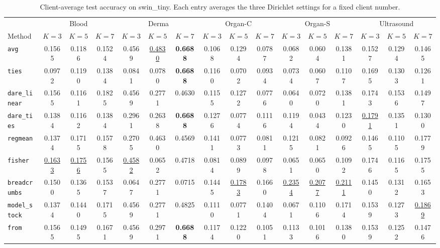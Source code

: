 \begin{table}[t]
\centering
\scriptsize
\setlength{\tabcolsep}{2.6pt}
\caption{Client-average test accuracy on swin\_tiny. Each entry averages the three Dirichlet settings for a fixed client number.}
\label{tab:client-avg-swin-tiny}
\begin{tabular}{lccccccccccccccc}
\toprule
& \multicolumn{3}{c}{Blood} & \multicolumn{3}{c}{Derma} & \multicolumn{3}{c}{Organ-C} & \multicolumn{3}{c}{Organ-S} & \multicolumn{3}{c}{Ultrasound} \\
\cmidrule(lr){2-4}\cmidrule(lr){5-7}\cmidrule(lr){8-10}\cmidrule(lr){11-13}\cmidrule(lr){14-16}
Method & $K=3$ & $K=5$ & $K=7$ & $K=3$ & $K=5$ & $K=7$ & $K=3$ & $K=5$ & $K=7$ & $K=3$ & $K=5$ & $K=7$ & $K=3$ & $K=5$ & $K=7$ \\
\midrule
\texttt{avg} & 0.1565 & 0.1186 & 0.1524 & 0.4569 & \underline{0.4830} & \textbf{0.6688} & 0.1068 & 0.1294 & 0.0787 & 0.0682 & 0.0604 & 0.1381 & 0.1527 & 0.1294 & 0.1465 \\
\texttt{ties} & 0.0972 & 0.1190 & 0.1384 & 0.0841 & 0.0780 & \textbf{0.6688} & 0.1160 & 0.0702 & 0.0934 & 0.0734 & 0.0607 & 0.1107 & 0.1695 & 0.1303 & 0.1261 \\
\texttt{dare\_linear} & 0.1565 & 0.1161 & 0.1825 & 0.4569 & 0.2771 & 0.4630 & 0.1155 & 0.1272 & 0.0776 & 0.0640 & 0.0720 & 0.1381 & 0.1743 & 0.1536 & 0.1497 \\
\texttt{dare\_ties} & 0.1384 & 0.1162 & 0.1384 & 0.2961 & 0.2638 & \textbf{0.6688} & 0.1276 & 0.0774 & 0.1116 & 0.1194 & 0.0434 & 0.1230 & \underline{0.1791} & 0.1351 & 0.1300 \\
\texttt{regmean} & 0.1374 & 0.1715 & 0.1578 & 0.2705 & 0.4630 & 0.4569 & 0.1411 & 0.0773 & 0.0811 & 0.1215 & 0.0821 & 0.0926 & 0.1465 & 0.1105 & 0.1779 \\
\texttt{fisher} & \underline{0.1633} & \underline{0.1756} & 0.1565 & \underline{0.4582} & 0.0652 & 0.4718 & 0.0814 & 0.0899 & 0.0978 & 0.0651 & 0.0650 & 0.1092 & 0.1746 & 0.1165 & 0.1755 \\
\texttt{breadcrumbs} & 0.1500 & 0.1365 & 0.1537 & 0.0647 & 0.2771 & 0.0715 & 0.1445 & \underline{0.1783} & 0.1660 & \underline{0.2354} & \underline{0.2077} & \underline{0.2111} & 0.1450 & 0.1312 & 0.1653 \\
\texttt{model\_stock} & 0.1374 & 0.1440 & 0.1715 & 0.4569 & 0.2771 & 0.4825 & 0.1110 & 0.0771 & 0.1404 & 0.0671 & 0.1106 & 0.1714 & 0.1539 & 0.1273 & \underline{0.1869} \\
\texttt{from} & 0.1565 & 0.1495 & 0.1671 & 0.4569 & 0.2971 & \textbf{0.6688} & 0.1174 & 0.1220 & 0.1051 & 0.1133 & 0.1016 & 0.1380 & 0.1539 & 0.1252 & 0.1476 \\

\end{tabular}
\end{table}
